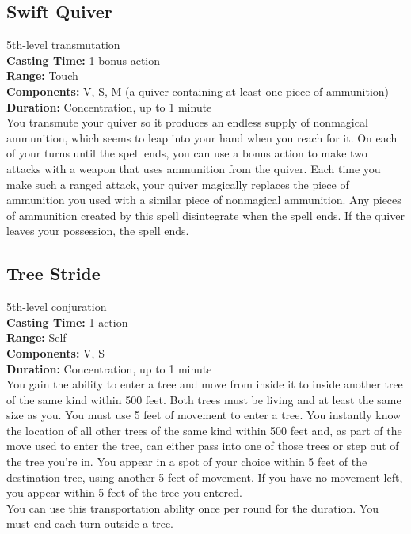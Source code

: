 \documentclass[11pt, A4paper, english]{article}
\begin{document}
		\subsection{Swift Quiver}
5th-level transmutation \\
\textbf{Casting Time:} 1 bonus action \\
\textbf{Range:} Touch \\
\textbf{Components:} V, S, M (a quiver containing at least one piece of ammunition) \\
\textbf{Duration:} Concentration, up to 1 minute \\
You transmute your quiver so it produces an endless supply of nonmagical ammunition, which seems to leap into your hand when you reach for it. On each of your turns until the spell ends, you can use a bonus action to make two attacks with a weapon that uses ammunition from the quiver. Each time you make such a ranged attack, your quiver magically replaces the piece of ammunition you used with a similar piece of nonmagical ammunition. Any pieces of ammunition created by this spell disintegrate when the spell ends. If the quiver leaves your possession, the spell ends.

		\subsection{Tree Stride}
5th-level conjuration \\
\textbf{Casting Time:} 1 action \\
\textbf{Range:} Self \\
\textbf{Components:} V, S \\
\textbf{Duration:} Concentration, up to 1 minute \\
You gain the ability to enter a tree and move from inside it to inside another tree of the same kind within 500 feet. Both trees must be living and at least the same size as you. You must use 5 feet of movement to enter a tree. You instantly know the location of all other trees of the same kind within 500 feet and, as part of the move used to enter the tree, can either pass into one of those trees or step out of the tree you’re in. You appear in a spot of your choice within 5 feet of the destination tree, using another 5 feet of movement. If you have no movement left, you appear within 5 feet of the tree you entered. \\
You can use this transportation ability once per round for the duration. You must end each turn outside a tree.
\end{document}

